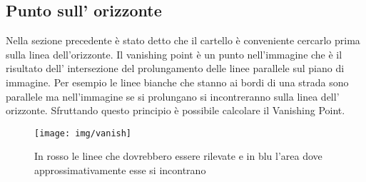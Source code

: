 	\subsection{Punto sull' orizzonte}

		Nella sezione precedente è stato detto che il cartello è conveniente cercarlo prima sulla linea dell'orizzonte.
		Il vanishing point è un punto nell'immagine che è il risultato  dell' intersezione del prolungamento delle linee parallele sul piano di immagine. Per esempio le linee bianche che stanno ai bordi di una strada sono parallele ma nell'immagine se si prolungano si incontreranno sulla linea dell' orizzonte. Sfruttando questo principio è possibile calcolare il Vanishing Point.
		\begin{figure}[!ht]
			\centering
			\texttt{[image: img/vanish]}
			\caption[Punto sull'orizzonte]{In rosso le linee che dovrebbero essere rilevate e in blu l'area dove approssimativamente esse si incontrano}
		\end{figure}

